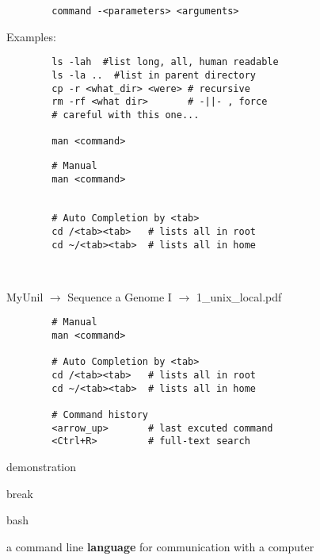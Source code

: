 \documentclass[xcolor=dvipsnames]{beamer}
\begin{document}
\begin{frame}[fragile]
	\begin{verbatim}
		command -<parameters> <arguments>
	\end{verbatim}
	Examples:
	\begin{verbatim}
		ls -lah  #list long, all, human readable
		ls -la ..  #list in parent directory
		cp -r <what_dir> <were> # recursive
		rm -rf <what dir>       # -||- , force
		# careful with this one...

		man <command>
	\end{verbatim}
\end{frame}

\begin{frame}[fragile]
	\Large
	\begin{verbatim}
		# Manual
		man <command>


		# Auto Completion by <tab>
		cd /<tab><tab>   # lists all in root
		cd ~/<tab><tab>  # lists all in home



	\end{verbatim}
\end{frame}

\begin{frame}[fragile]
	\begin{center}
		MyUnil $\rightarrow$ Sequence a Genome I $\rightarrow$ 1\_unix\_local.pdf
	\end{center}
	\Large
	\begin{verbatim}
		# Manual
		man <command>

		# Auto Completion by <tab>
		cd /<tab><tab>   # lists all in root
		cd ~/<tab><tab>  # lists all in home

		# Command history
		<arrow_up>       # last excuted command
		<Ctrl+R>         # full-text search
	\end{verbatim}
\end{frame}

\begin{frame}
	\Huge
	\begin{center}
		demonstration
	\end{center}
\end{frame}

\begin{frame}
	\Huge
	\begin{center}
		break
	\end{center}
\end{frame}

\begin{frame}
	\Huge
	\begin{center}
		bash
	\end{center}
	\large
	a command line \huge \textbf{language} \large for communication with a computer
\end{frame}
\end{document}

